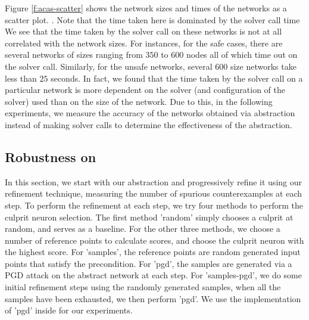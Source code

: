 Figure \ref{f:acas-scatter} shows the network sizes and times of the \acasxu
networks as a scatter plot. . Note that the
time taken here is dominated by the solver call time   We see that the time taken by the solver call on
these networks is not at all correlated with the network sizes. For instances,
for the safe cases, there are several networks of sizes ranging from $350$ to
$600$ \relu nodes all of which time out on the solver call. Similarly, for the
unsafe networks, several $600$ size networks take less than $25$ seconds. In
fact, we found that the time taken by the solver call on a particular network is
more dependent on the solver (and configuration of the solver) used than on the
size of the network. Due to this, in the following experiments, we measure the
accuracy of the networks obtained via abstraction instead of making solver calls
to determine the effectiveness of the abstraction. 

\subsection{Robustness on \mnist}

In this section, we start with our abstraction and progressively refine it using
our refinement technique, measuring the number of spurious counterexamples at
each step. To perform the refinement at each step, we try four methods to
perform the culprit neuron selection. The first method 'random' simply chooses a
culprit at random, and serves as a baseline. For the other three methods, we
choose a number of reference points to calculate scores, and choose the culprit
neuron with the highest score. For 'samples', the reference points are random
generated input points that satisfy the precondition. For 'pgd', the samples are
generated via a PGD  attack on the abstract network at each step. For
'samples-pgd', we do some initial refinement steps using the randomly generated
samples, when all the samples have been exhausted, we then perform 'pgd'. We use
the implementation of 'pgd' inside \abcrown for our experiments.

